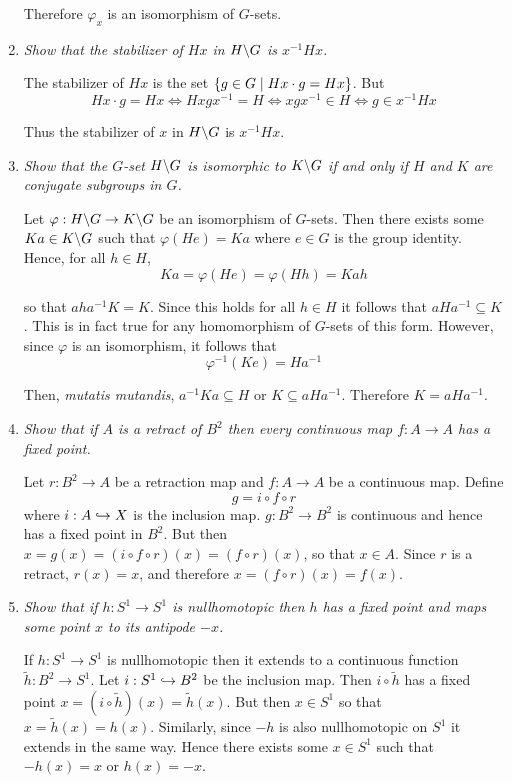 \documentclass[10pt]{article}
\begin{document}
\begin{enumerate}
Therefore $\varphi_x$ is an isomorphism of $G$-sets.

\item \emph{Show that the stabilizer of $Hx$ in $H \backslash G$ is $x^{-1}Hx$.}

The stabilizer of $Hx$ is the set $\left\{ g \in G \mid Hx \cdot g = Hx \right\}$.  But
\[
Hx \cdot g = Hx \Leftrightarrow Hxgx^{-1} = H \Leftrightarrow xgx^{-1} \in H \Leftrightarrow g \in x^{-1}Hx
\]

Thus the stabilizer of $x$ in $H \backslash G$ is $x^{-1}Hx$.
\item \emph{Show that the $G$-set $H \backslash G$ is isomorphic to $K \backslash G$ if and only if $H$ and $K$ are conjugate subgroups in $G$.}

Let $\varphi: H \backslash G \rightarrow K \backslash G$ be an isomorphism of $G$-sets.  Then there exists some $Ka \in K \backslash G$ such that $\varphi\left(He\right) = Ka$ where $e \in G$ is the group identity.  Hence, for all $h \in H$, 
\[
Ka = \varphi\left(He\right) = \varphi\left(Hh\right) = Kah
\]

so that $aha^{-1}K = K$.  Since this holds for all $h \in H$ it follows that $aHa^{-1} \subseteq K$.  This is in fact true for any homomorphism of $G$-sets of this form.  However, since $\varphi$ is an isomorphism, it follows that
\[
\varphi^{-1}\left(Ke\right) = Ha^{-1}
\]

Then, \emph{mutatis mutandis}, $a^{-1}Ka \subseteq H$ or $K \subseteq aHa^{-1}$.  Therefore $K = aHa^{-1}$.

\item \emph{Show that if $A$ is a retract of $B^2$ then every continuous map $f: A \rightarrow A$ has a fixed point.}

Let $r: B^2 \rightarrow A$ be a retraction map and $f: A \rightarrow A$ be a continuous map.  Define $$g = i \circ f \circ r$$ where $i: A \hookrightarrow X$ is the inclusion map.  $g: B^2 \rightarrow B^2$ is continuous and hence has a fixed point in $B^2$.  But then $x = g(x) = (i \circ f \circ r)(x) = (f \circ r)(x)$, so that $x \in A$.  Since $r$ is a retract, $r(x) = x$, and therefore $x = (f \circ r)(x) = f(x)$.

\item \emph{Show that if $h: S^1 \rightarrow S^1$ is nullhomotopic then $h$ has a fixed point and maps some point $x$ to its antipode $-x$.}

If $h: S^1 \rightarrow S^1$ is nullhomotopic then it extends to a continuous function $\tilde{h}: B^2 \rightarrow S^1$.  Let $i: S^1 \hookrightarrow B^2$ be the inclusion map.  Then $i \circ \tilde{h}$ has a fixed point $x = (i \circ \tilde{h})(x) = \tilde{h}(x)$.  But then $x \in S^1$ so that $x = \tilde{h}(x) = h(x)$.  Similarly, since $-h$ is also nullhomotopic on $S^1$ it extends in the same way.  Hence there exists some $x \in S^1$ such that $-h(x) = x$ or $h(x) = -x$.


\end{enumerate}
\end{document}
